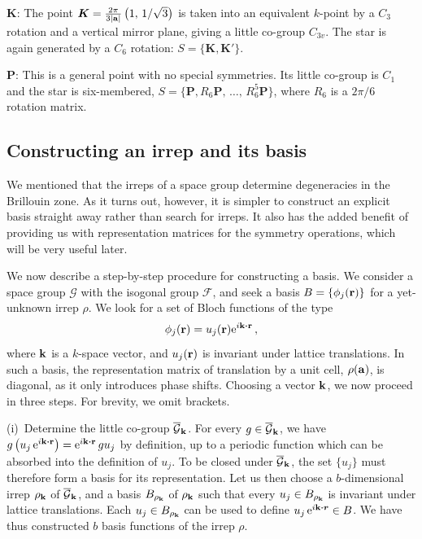 $\boldsymbol{K}$: The point $\boldsymbol{K} =  \frac{2\pi}{3 \abs{\vb{a}}} \left(1,\, 1/\sqrt{3} \right)$ is taken into an equivalent $k$-point by a $C_3$ rotation and a vertical mirror plane, giving a little co-group $C_{3v}$. The star is again generated by a $C_6$ rotation: $S = \{\boldsymbol{K}, \boldsymbol{K}' \}$. 

$\boldsymbol{P}$: This is a general point with no special symmetries. Its little co-group is $C_1$ and the star is six-membered, $S = \{ \boldsymbol{P}, R_6 \boldsymbol{P}, \, \ldots ,\, R_6^5 \boldsymbol{P} \}$, where $R_6$ is a $2\pi/6$ rotation matrix. 


\subsection{Constructing an irrep and its basis} \label{sec:symm_irrep_cons}
We mentioned that the irreps of a space group determine degeneracies in the Brillouin zone. As it turns out, however, it is simpler to construct an explicit basis straight away rather than search for irreps. It also has the added benefit of providing us with representation matrices for the symmetry operations, which will be very useful later. 

We now describe a step-by-step procedure for constructing a basis. We consider a space group $\mathcal{G}$ with the isogonal group $\mathcal{F}$, and seek a basis $B = \{\phi_j(\vb{r}) \}$ for a yet-unknown irrep $\rho$. We look for a set of Bloch functions of the type
\begin{equation} \label{seq:blochfunc}
\phi_j(\vb{r}) = u_j(\vb{r}) \e^{i \vb{k} \vdot \vb{r}}\,,
\end{equation}
where $\vb{k}$ is a $k$-space vector, and $u_j(\vb{r})$ is invariant under lattice translations. In such a basis, the representation matrix of translation by a unit cell, $\rho(\vb{a})$, is diagonal, as it only introduces phase shifts. Choosing a vector $\vb{k}$, we now proceed in three steps. For brevity, we omit brackets.

(i)~Determine the little co-group ${\overline{\mathcal{G}}}_{\vb{k}}$. For every $g \in {\overline{\mathcal{G}}}_{\vb{k}}$, we have $g \left(u_j\, \e^{i \vb{k} \vdot \vb{r}}\right) = \e^{i \vb{k} \vdot \vb{r}} \,g u_j$ by definition, up to a periodic function which can be absorbed into the definition of $u_j$. To be closed under ${\overline{\mathcal{G}}}_{\vb{k}}$, the set $\{u_j\}$ must therefore form a basis for its representation. Let us then choose a $b$-dimensional irrep $\rho_{\vb{k}}$ of $\overline{\mathcal{G}}_{\vb{k}}$, and a basis $B_{\rho_{\vb{k}}}$ of $\rho_{\vb{k}}$ such that every $u_j \in B_{\rho_{\vb{k}}}$ is invariant under lattice translations. Each $u_j \in B_{\rho_{\vb{k}}}$ can be used to define $u_j\, \e^{i\vb{k}\vdot\boldsymbol{r}} \in B$. We have thus constructed $b$ basis functions of the irrep $\rho$.

